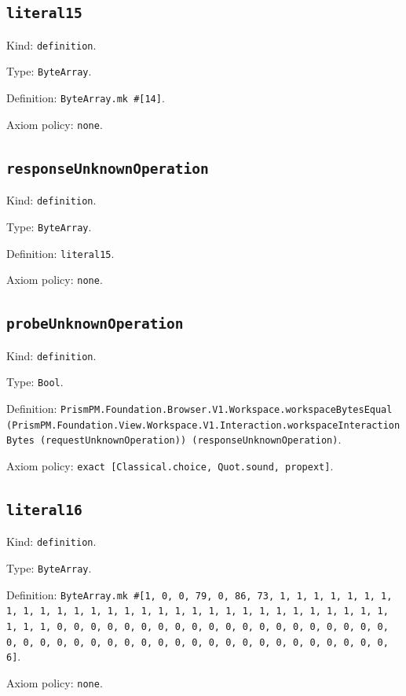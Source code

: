 \documentclass[11pt]{article}
\begin{document}
\subsection*{\texttt{literal15}}
\noindent Kind: \texttt{definition}.\par
\noindent Type: \texttt{ByteArray}.\par
\noindent Definition: \texttt{ByteArray.mk \#[14]}.\par
\noindent Axiom policy: \texttt{none}.\par
\subsection*{\texttt{responseUnknownOperation}}
\noindent Kind: \texttt{definition}.\par
\noindent Type: \texttt{ByteArray}.\par
\noindent Definition: \texttt{literal15}.\par
\noindent Axiom policy: \texttt{none}.\par
\subsection*{\texttt{probeUnknownOperation}}
\noindent Kind: \texttt{definition}.\par
\noindent Type: \texttt{Bool}.\par
\noindent Definition: \texttt{PrismPM.Foundation.Browser.V1.Workspace.workspaceBytesEqual (PrismPM.Foundation.View.Workspace.V1.Interaction.workspaceInteractionBytes (requestUnknownOperation)) (responseUnknownOperation)}.\par
\noindent Axiom policy: \texttt{exact [Classical.choice, Quot.sound, propext]}.\par
\subsection*{\texttt{literal16}}
\noindent Kind: \texttt{definition}.\par
\noindent Type: \texttt{ByteArray}.\par
\noindent Definition: \texttt{ByteArray.mk \#[1, 0, 0, 79, 0, 86, 73, 1, 1, 1, 1, 1, 1, 1, 1, 1, 1, 1, 1, 1, 1, 1, 1, 1, 1, 1, 1, 1, 1, 1, 1, 1, 1, 1, 1, 1, 1, 1, 1, 1, 0, 0, 0, 0, 0, 0, 0, 0, 0, 0, 0, 0, 0, 0, 0, 0, 0, 0, 0, 0, 0, 0, 0, 0, 0, 0, 0, 0, 0, 0, 0, 0, 0, 0, 0, 0, 0, 0, 0, 0, 0, 0, 0, 6]}.\par
\noindent Axiom policy: \texttt{none}.\par
\end{document}
